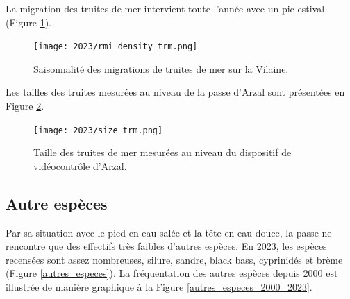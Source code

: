 \documentclass[11pt,twocolumn,titlepage,twoside]{article}\usepackage[]{graphicx}\usepackage[]{color}
\begin{document}

% 

 

La migration des truites de mer intervient toute l'année avec un pic estival
(Figure \ref{rmi_density_trm}). 

\begin{figure}[htpb]
\centering
\texttt{[image: 2023/rmi\_density\_trm.png]} 
\caption{Saisonnalité des migrations de truites de mer sur la Vilaine.}
\label{rmi_density_trm}
\end{figure}


Les tailles des truites mesurées au niveau de la passe d'Arzal sont présentées
en Figure \ref{size_trm}.

\begin{figure}[htpb]
\centering
\texttt{[image: 2023/size\_trm.png]} 
\caption{Taille des truites de mer mesurées au niveau du dispositif de
vidéocontrôle d'Arzal.}
\label{size_trm}
\end{figure}








\clearpage
\subsection{Autre espèces}


Par sa situation avec le pied en eau salée et la tête en eau douce, la passe ne
rencontre que des effectifs très faibles d'autres espèces. En 2023, les
espèces recensées sont assez
nombreuses, silure, sandre, black bass, cyprinidés et brème (Figure
\ref{autres_especes}). 
La fréquentation des autres espèces depuis 2000 est illustrée de manière
graphique à la Figure \ref{autres_especes_2000_2023}. 
\end{document}
